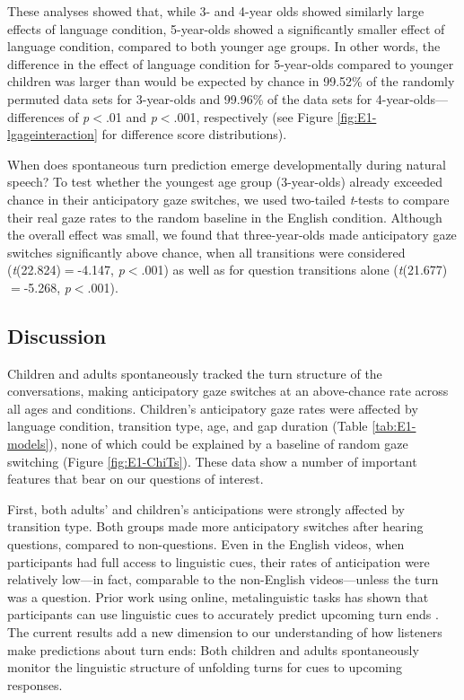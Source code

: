 \documentclass[authoryear, 12pt]{elsarticle}
\begin{document}
These analyses showed that, while 3- and 4-year olds showed similarly large effects of language condition, 5-year-olds showed a significantly smaller effect of language condition, compared to both younger age groups. In other words, the difference in the effect of language condition for 5-year-olds compared to younger children was larger than would be expected by chance in 99.52\% of the randomly permuted data sets for 3-year-olds and 99.96\% of the data sets for 4-year-olds---differences of \textit{p}$<$.01 and \textit{p}$<$.001, respectively (see Figure \ref{fig:E1-lgageinteraction} for difference score distributions).

When does spontaneous turn prediction emerge developmentally during natural speech? To test whether the youngest age group (3-year-olds) already exceeded chance in their anticipatory gaze switches, we used two-tailed \textit{t}-tests to compare their real gaze rates to the random baseline in the English condition. Although the overall effect was small, we found that three-year-olds made anticipatory gaze switches significantly above chance, when all transitions were considered (\textit{t}(22.824)$=$-4.147, \textit{p}$<$.001) as well as for question transitions alone (\textit{t}(21.677)$=$-5.268, \textit{p}$<$.001).

\subsection{Discussion}
\label{sec:discussion1}

Children and adults spontaneously tracked the turn structure of the conversations, making anticipatory gaze switches at an above-chance rate across all ages and conditions. Children's anticipatory gaze rates were affected by language condition, transition type, age, and gap duration (Table \ref{tab:E1-models}), none of which could be explained by a baseline of random gaze switching (Figure \ref{fig:E1-ChiTs}). These data show a number of important features that bear on our questions of interest. 

First, both adults' and children's anticipations were strongly affected by transition type. Both groups made more anticipatory switches after hearing questions, compared to non-questions. Even in the English videos, when participants had full access to linguistic cues, their rates of anticipation were relatively low---in fact, comparable to the non-English videos---unless the turn was a question. Prior work using online, metalinguistic tasks has shown that participants can use linguistic cues to accurately predict upcoming turn ends \citep{torreira2015, magyari2012, de-ruiter2006}. The current results add a new dimension to our understanding of how listeners make predictions about turn ends: Both children and adults spontaneously monitor the linguistic structure of unfolding turns for cues to upcoming responses.
\end{document}
